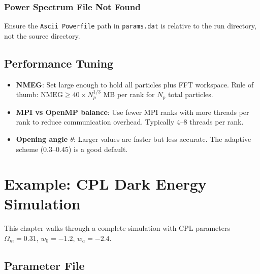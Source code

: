 \documentclass[11pt,fleqn]{book}
\newcommand{\code}[1]{\texttt{#1}}
\newcommand{\file}[1]{\texttt{#1}}
\begin{document}
\subsection{Power Spectrum File Not Found}

Ensure the \code{Ascii Powerfile} path in \file{params.dat} is relative to the run directory, not the source directory.

\section{Performance Tuning}

\begin{itemize}[leftmargin=2em]
  \item \textbf{NMEG}: Set large enough to hold all particles plus FFT workspace.  Rule of thumb: $\text{NMEG} \geq 40 \times N_p^{1/3}$ MB per rank for $N_p$ total particles.
  \item \textbf{MPI vs OpenMP balance}: Use fewer MPI ranks with more threads per rank to reduce communication overhead.  Typically 4--8 threads per rank.
  \item \textbf{Opening angle $\theta$}: Larger values are faster but less accurate.  The adaptive scheme (0.3--0.45) is a good default.
\end{itemize}


\chapter{Example: CPL Dark Energy Simulation}
\label{ch:example}

This chapter walks through a complete simulation with CPL parameters $\Omega_m = 0.31$, $w_0 = -1.2$, $w_a = -2.4$.

\section{Parameter File}
\end{document}
